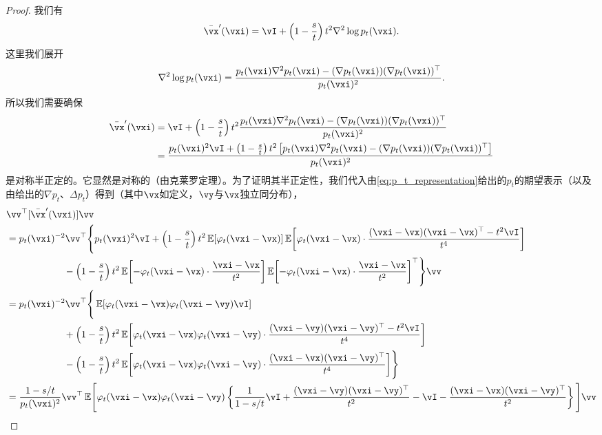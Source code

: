 \documentclass[../../book-main_zh.tex]{subfiles}
\begin{document}
\begin{proof}
    我们有
    \begin{equation}
        \bar{\vx}^{\prime}(\vxi) = \vI + \bp{1 - \frac{s}{t}}t^{2}\nabla^{2}\log p_{t}(\vxi).
    \end{equation}
    这里我们展开
    \begin{equation}
        \nabla^{2}\log p_{t}(\vxi) = \frac{p_{t}(\vxi)\nabla^{2}p_{t}(\vxi) - (\nabla p_{t}(\vxi))(\nabla p_{t}(\vxi))^{\top}}{p_{t}(\vxi)^{2}}.
    \end{equation}
    所以我们需要确保
    \begin{align}
        \bar{\vx}^{\prime}(\vxi)
        &= \vI + \bp{1 - \frac{s}{t}}t^{2}\frac{p_{t}(\vxi)\nabla^{2}p_{t}(\vxi) - (\nabla p_{t}(\vxi))(\nabla p_{t}(\vxi))^{\top}}{p_{t}(\vxi)^{2}} \\
        &= \frac{p_{t}(\vxi)^{2}\vI + \bp{1 - \frac{s}{t}}t^{2}\bs{p_{t}(\vxi)\nabla^{2}p_{t}(\vxi) - (\nabla p_{t}(\vxi))(\nabla p_{t}(\vxi))^{\top}}}{p_{t}(\vxi)^{2}}
    \end{align}
    是对称半正定的。它显然是对称的（由克莱罗定理）。为了证明其半正定性，我们代入由\eqref{eq:p_t_representation}给出的\(p_{t}\)的期望表示（以及由给出的\(\nabla p_{t}\)、\(\Delta p_{t}\)）得到（其中\(\vx\)如定义，\(\vy\)与\(\vx\)独立同分布），
    \begin{align}
        &\vv^{\top}[\bar{\vx}^{\prime}(\vxi)]\vv \\
        &= p_{t}(\vxi)^{-2}\vv^{\top}\Bigg\{p_{t}(\vxi)^{2}\vI + \bp{1 - \frac{s}{t}}t^{2}\Ex[\phi_{t}(\vxi - \vx)]\Ex\rs{\phi_{t}(\vxi - \vx)\cdot\frac{(\vxi - \vx)(\vxi - \vx)^{\top} - t^{2}\vI}{t^{4}}} \\
        & \qquad \qquad \qquad -\bp{1 - \frac{s}{t}}t^{2}\Ex\rs{-\phi_{t}(\vxi - \vx)\cdot\frac{\vxi - \vx}{t^{2}}}\Ex\rs{-\phi_{t}(\vxi - \vx)\cdot\frac{\vxi - \vx}{t^{2}}}^{\top}\Bigg\}\vv \\
        &= p_{t}(\vxi)^{-2}\vv^{\top}\Bigg\{\Ex[\phi_{t}(\vxi - \vx)\phi_{t}(\vxi - \vy)\vI] \\
        & \qquad \qquad \qquad + \bp{1 - \frac{s}{t}}t^{2}\Ex\rs{\phi_{t}(\vxi - \vx)\phi_{t}(\vxi - \vy)\cdot\frac{(\vxi - \vy)(\vxi - \vy)^{\top} - t^{2}\vI}{t^{4}}} \\
        & \qquad \qquad \qquad -\bp{1 - \frac{s}{t}}t^{2}\Ex\rs{\phi_{t}(\vxi - \vx)\phi_{t}(\vxi - \vy)\cdot\frac{(\vxi - \vx)(\vxi - \vy)^{\top}}{t^{4}}}\Bigg\} \\ 
        &= \frac{1 - s/t}{p_{t}(\vxi)^{2}}\vv^{\top}\Ex\mathopen{}\Bigg[\phi_{t}(\vxi - \vx)\phi_{t}(\vxi - \vy)\bc{\frac{1}{1 - s/t}\vI + \frac{(\vxi - \vy)(\vxi - \vy)^{\top}}{t^{2}} - \vI - \frac{(\vxi - \vx)(\vxi - \vy)^{\top}}{t^{2}}}\Bigg]\vv \\

\end{align}
\end{proof}
\end{document}
